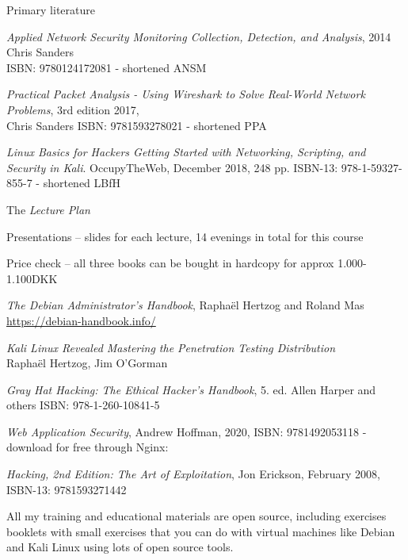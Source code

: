 \documentclass[Screen16to9,17pt]{foils}
\begin{document}
Primary literature
\begin{list2}
\item \emph{Applied Network Security Monitoring Collection, Detection, and Analysis}, 2014 Chris Sanders \\
ISBN: 9780124172081 - shortened ANSM
\item \emph{Practical Packet Analysis - Using Wireshark to Solve Real-World Network Problems}, 3rd edition 2017, \\
Chris Sanders ISBN: 9781593278021 - shortened PPA
\item \emph{Linux Basics for Hackers Getting Started with Networking, Scripting, and Security in Kali}. OccupyTheWeb, December 2018, 248 pp. ISBN-13: 978-1-59327-855-7 - shortened LBfH
\item The \emph{Lecture Plan}\\
\item Presentations -- slides for each lecture, 14 evenings in total for this course\\{\footnotesize
{}}
\end{list2}

Price check -- all three books can be bought in hardcopy for approx 1.000-1.100DKK



\begin{list2}
\item \emph{The Debian Administrator’s Handbook}, Raphaël Hertzog and Roland Mas\\
\url{https://debian-handbook.info/}
\item \emph{Kali Linux Revealed  Mastering the Penetration Testing Distribution}\\
Raphaël Hertzog, Jim O'Gorman\\

\item \emph{Gray Hat Hacking: The Ethical Hacker's Handbook}, 5. ed. Allen Harper and others ISBN: 978-1-260-10841-5
\item \emph{Web Application Security}, Andrew Hoffman, 2020, ISBN: 9781492053118 - download for free through Nginx:\\

\item \emph{Hacking, 2nd Edition: The Art of Exploitation}, Jon Erickson, February 2008, ISBN-13: 9781593271442
\item All my training and educational materials are open source, including exercises booklets with small exercises that you can do with virtual machines like Debian and Kali Linux using lots of open source tools.\\
{\bf {}}
\end{list2}
\end{document}
